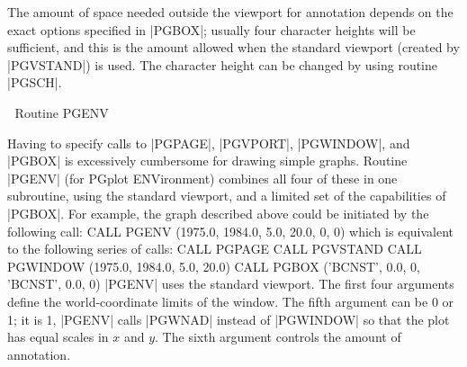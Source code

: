 The amount of space needed outside the viewport for annotation
depends on the exact options specified in |PGBOX|; usually four
character heights will be sufficient, and this is the amount allowed
when the standard viewport (created by |PGVSTAND|) is used. The character
height can be changed by using routine |PGSCH|.


\beginsection Routine PGENV

Having to specify calls to |PGPAGE|, |PGVPORT|, |PGWINDOW|, and
|PGBOX| is excessively cumbersome for drawing simple graphs. Routine
|PGENV| (for PGplot ENVironment) combines all four of these in one
subroutine, using the standard viewport, and a limited set of the
capabilities of |PGBOX|.  For example, the graph described above could
be initiated by the following call: 
\begintt
CALL PGENV (1975.0, 1984.0, 5.0, 20.0, 0, 0)
\endtt
which is equivalent to the following series of calls:
\begintt
CALL PGPAGE
CALL PGVSTAND
CALL PGWINDOW (1975.0, 1984.0, 5.0, 20.0)
CALL PGBOX ('BCNST', 0.0, 0, 'BCNST', 0.0, 0)
\endtt
|PGENV| uses the standard viewport.  The first four arguments define the
world-coordinate limits of the window. The fifth argument can be 0 or 1; 
it is 1, |PGENV| calls |PGWNAD| instead of |PGWINDOW| so that the plot
has equal scales in $x$ and $y$. The sixth argument controls the amount
of annotation.

\endchapter

